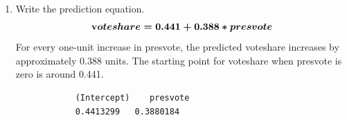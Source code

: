 \documentclass[12pt,letterpaper]{article}
\begin{document}
\begin{enumerate}
	
	
	
		\item Write the prediction equation.
			\vspace{.25cm}
			\[
			\boldmath
			\textbf
			voteshare = 0.441 + 0.388 * presvote
			\]
			For every one-unit increase in presvote, the predicted voteshare increases by approximately 0.388 units. The starting point for voteshare when presvote is zero is around 0.441.
			\vspace{.25cm}
			 
			\begin{verbatim}
			(Intercept)    presvote 
			0.4413299   0.3880184 
			\end{verbatim}			
		
	
	\end{enumerate}
	
	
	
	
\newpage	
\end{document}
